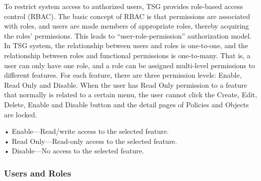 To restrict system access to authorized users, TSG provides role-based access control (RBAC). The basic concept of RBAC is that permissions are associated with roles, 
and users are made members of appropriate roles, thereby acquiring the roles' permissions. This leads to “user-role-permission” authorization model. In TSG system, 
the relationship between users and roles is one-to-one, and the relationship between roles and functional permissions is one-to-many. That is, a user can only have one role, 
and a role can be assigned multi-level permissions to different features. For each feature, there are three permission levels: Enable, Read Only and Disable. 
When the user has Read Only permission to a feature that normally is related to a certain menu, the user cannot click the Create, Edit, Delete, Enable and Disable button 
and the detail pages of Policies and Objects are locked. 


• Enable—Read/write access to the selected feature.\\   
• Read Only—Read-only access to the selected feature.\\   
• Disable—No access to the selected feature.\\

\subsubsection*{\hypertarget{link:Users and Roles}{Users and Roles}}
\label{sec:intro:admin:users:role}

